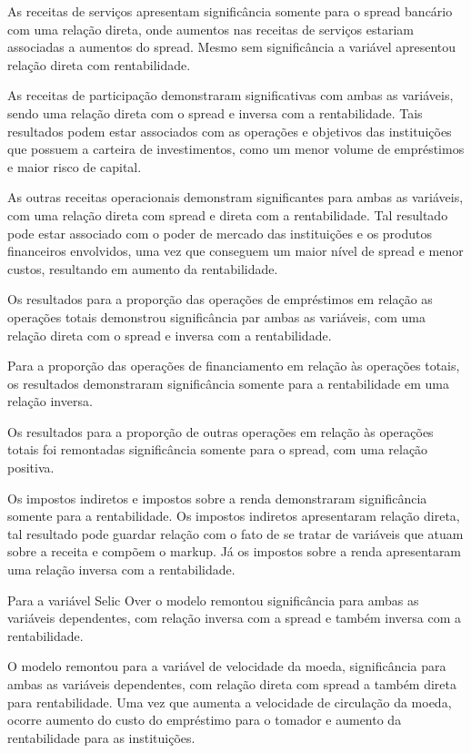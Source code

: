\documentclass[
  12pt,
  12pt,
  openright,
  oneside,
  a4paper,
  chapter=TITLE,
  section=TITLE,
  subsection=TITLE,
  subsubsection=TITLE,
  english,
  portugues,
  sumario=tradicional]{abntex2}
\begin{document}
As receitas de serviços apresentam significância somente para o spread bancário com uma relação direta, onde aumentos nas receitas de serviços estariam associadas a aumentos do spread. Mesmo sem significância a variável apresentou relação direta com rentabilidade.

As receitas de participação demonstraram significativas com ambas as variáveis, sendo uma relação direta com o spread e inversa com a rentabilidade. Tais resultados podem estar associados com as operações e objetivos das instituições que possuem a carteira de investimentos, como um menor volume de empréstimos e maior risco de capital.

As outras receitas operacionais demonstram significantes para ambas as variáveis, com uma relação direta com spread e direta com a rentabilidade. Tal resultado pode estar associado com o poder de mercado das instituições e os produtos financeiros envolvidos, uma vez que conseguem um maior nível de spread e menor custos, resultando em aumento da rentabilidade.

Os resultados para a proporção das operações de empréstimos em relação as operações totais demonstrou significância par ambas as variáveis, com uma relação direta com o spread e inversa com a rentabilidade.

Para a proporção das operações de financiamento em relação às operações totais, os resultados demonstraram significância somente para a rentabilidade em uma relação inversa.

Os resultados para a proporção de outras operações em relação às operações totais foi remontadas significância somente para o spread, com uma relação positiva.

Os impostos indiretos e impostos sobre a renda demonstraram significância somente para a rentabilidade. Os impostos indiretos apresentaram relação direta, tal resultado pode guardar relação com o fato de se tratar de variáveis que atuam sobre a receita e compõem o markup. Já os impostos sobre a renda apresentaram uma relação inversa com a rentabilidade.

Para a variável Selic Over o modelo remontou significância para ambas as variáveis dependentes, com relação inversa com a spread e também inversa com a rentabilidade.

O modelo remontou para a variável de velocidade da moeda, significância para ambas as variáveis dependentes, com relação direta com spread a também direta para rentabilidade. Uma vez que aumenta a velocidade de circulação da moeda, ocorre aumento do custo do empréstimo para o tomador e aumento da rentabilidade para as instituições.
\end{document}

